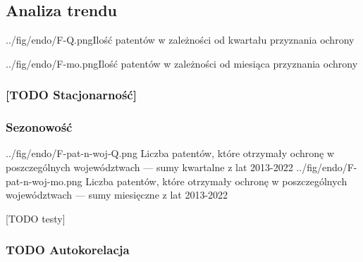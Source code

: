 


  \newpage\subsection
{Analiza trendu}



  \fig
{../fig/endo/F-Q.png}{Ilość patentów w zależności od kwartału przyznania ochrony}

  \fig
{../fig/endo/F-mo.png}{Ilość patentów w zależności od miesiąca przyznania ochrony}



  \subsubsection
{[TODO Stacjonarność]}




  \newpage\subsubsection
{Sezonowość}

  \figsides
{../fig/endo/F-pat-n-woj-Q.png}
{ Liczba patentów, które otrzymały ochronę w poszczególnych województwach 
  --- sumy kwartalne z lat 2013-2022 }
{../fig/endo/F-pat-n-woj-mo.png}
{ Liczba patentów, które otrzymały ochronę w poszczególnych województwach 
  --- sumy miesięczne z lat 2013-2022 }

[TODO testy]

  \subsubsection
{TODO Autokorelacja}